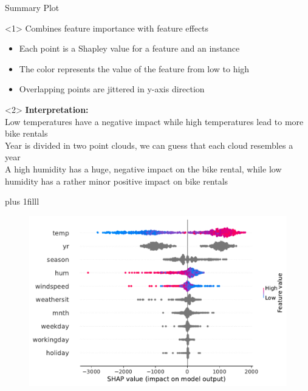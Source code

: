 \documentclass[11pt,compress,t,notes=noshow, aspectratio=169, xcolor=table]{beamer}
\newcommand{\btVFill}{\vskip0pt plus 1filll}
\begin{document}
\begin{vbframe}{Summary Plot}
\begin{onlyenv}<1>
Combines feature importance with feature effects
\begin{itemize}
    \item Each point is a Shapley value for a feature and an instance
    \item The color represents the value of the feature from low to high
    \item Overlapping points are jittered in y-axis direction
\end{itemize}
\end{onlyenv}

\begin{onlyenv}<2>
\textbf{Interpretation:}\\
Low temperatures have a negative impact while high temperatures lead to more bike rentals \\
Year is divided in two point clouds, we can guess that each cloud resembles a year\\
A high humidity has a huge, negative impact on the bike rental, while low humidity has a rather minor positive impact on bike rentals
\end{onlyenv}

\btVFill

\begin{figure}
    \centering
    \includegraphics[width=0.5\columnwidth]{slides/shapley/figure_man/global_shap_jitter.pdf}
    
\end{figure}
\end{vbframe} 
\end{document}
